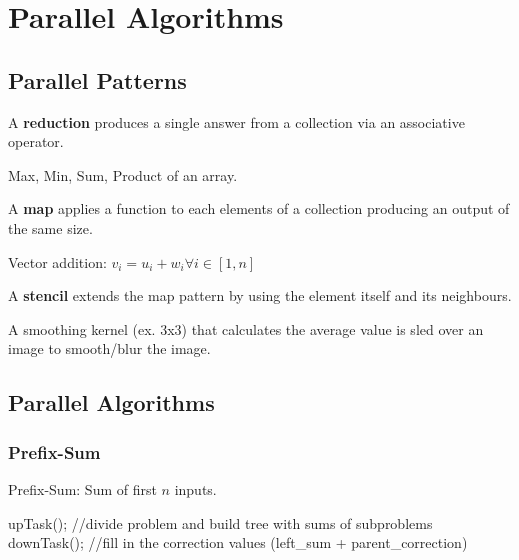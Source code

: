 \section{Parallel Algorithms}

\subsection{Parallel Patterns}

\begin{definition}
A \textbf{reduction} produces a single answer from a collection via an associative operator.
\end{definition}

\begin{example}
Max, Min, Sum, Product of an array.
\end{example}

\begin{definition}
A \textbf{map} applies a function to each elements of a collection producing an output of the same size.
\end{definition}

\begin{example}
Vector addition: $v_i = u_i + w_i \forall i \in [1, n]$
\end{example}

\begin{definition}
A \textbf{stencil} extends the map pattern by using the element itself and its neighbours.  
\end{definition}

\begin{example}
A smoothing kernel (ex. 3x3) that calculates the average value is sled over an image to smooth/blur the image.
\end{example}

\subsection{Parallel Algorithms}

\subsubsection{Prefix-Sum}

Prefix-Sum: Sum of first $n$ inputs.

\begin{algorithm}
upTask(); //divide problem and build tree with sums of subproblems
downTask(); //fill in the correction values (left_sum + parent_correction)
\end{algorithm}

